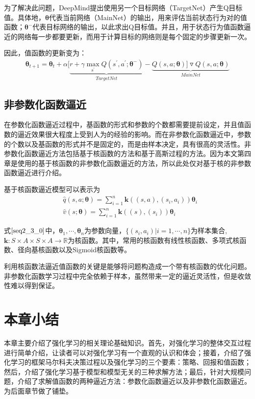 为了解决此问题，DeepMind提出使用另一个目标网络（TargetNet）产生Q目标值。具体地，$\bm{\theta}$代表当前网络（MainNet）的输出，用来评估当前状态行为对的值函数；$\bm{\theta}^{-}$代表目标网络的输出，以此求出Q目标值。并且，用于状态行为值函数逼近的网络每一步都要更新，而用于计算目标的网络则是每个固定的步骤更新一次。

因此，值函数的更新变为：
\begin{equation}
\begin{aligned}
\bm{\theta}_{t+1}=\bm{\theta}_{t}+\alpha[\underbrace{r+\gamma \max_{s^{'}}Q(s^{'},a^{'};\bm{\theta}^{-})}_{TargetNet}-\underbrace{Q(s,a;\bm{\theta})]\triangledown Q(s,a;\bm{\theta})}_{MainNet}
\end{aligned}
\end{equation}

\subsection{非参数化函数逼近}
在参数化函数逼近过程中，基函数的形式和参数的个数都需要提前设定，并且值函数的逼近效果很大程度上受到人为的经验的影响。而在非参数化函数逼近中，参数的个数以及基函数的形式并不是固定的，而是由样本决定，具有很高的灵活性。非参数化函数逼近方法包括基于核函数的方法和基于高斯过程的方法。因为本文第四章是使用的基于核函数的非参数化函数逼近的方法，所以此处仅对基于核的非参数函数逼近进行介绍。

基于核函数逼近模型可以表示为
\begin{equation}\label{seq2_3_0}
\begin{aligned}
&\hat{q}(s,a;\bm{\theta})=\sum^{n}_{i=1}\bm{k}((s,a),(s_{i},a_{i}))\bm{\theta}_{i}\\
&\hat{v}(s;\bm{\theta})=\sum^{n}_{i=1}\bm{k}((s),(s_{i}))\bm{\theta}_{i}
\end{aligned}
\end{equation}

式$\eqref{seq2_3_0}$中，$\bm{\theta}_{1},\cdots,\bm{\theta}_{n}$为参数向量，$\{(s_{i},a_{i})|i=1,\cdots,n\}$为样本集合,$\bm{k}:S\times A \times S \times A \to \mathbb{R} $为核函数。其中，常用的核函数有线性核函数、多项式核函数、径向基核函数以及Sigmoid核函数等。

利用核函数法逼近值函数的关键是能够将问题构造成一个带有核函数的优化问题。非参数化函数学习过程中完全依赖于样本，虽然带来一定的逼近灵活性，但是收敛性难以得到保证。

\section{本章小结}
 本章主要介绍了强化学习的相关理论基础知识。首先，对强化学习的整体交互过程进行简单介绍，让读者可以对强化学习有一个直观的认识和体会；接着，介绍了强化学习的框架马尔科夫决策过程以及强化学习的三个要素：策略、回报和值函数；然后，介绍了强化学习基于模型和模型无关的三种求解方法；最后，针对大规模问题，介绍了求解值函数的两种逼近方法：参数化函数逼近以及非参数化函数逼近。为后面章节做了铺垫。
